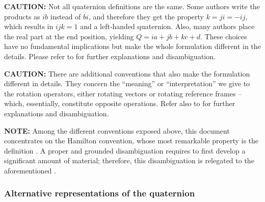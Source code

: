 \bigskip

{\bf CAUTION:} Not all quaternion definitions are the same. 
Some authors write the products as $ib$ instead of $bi$, and therefore they get the property $k = ji = -ij$, which results in $ijk=1$ and a left-handed quaternion. 
Also, many authors place the real part at the end position, yielding $Q = ia + jb + kc + d$. 
These choices have no fundamental implications but make the whole formulation different in the details. 
Please refer to  for further explanations and disambiguation.

\bigskip

{\bf CAUTION:} There are additional conventions that also make the formulation different in details. 
They concern the ``meaning'' or ``interpretation'' we give to the rotation operators, either rotating vectors or rotating reference frames --which, essentially, constitute opposite operations. 
Refer also to  for further explanations and disambiguation.

\bigskip 

{\bf NOTE:} Among the different conventions exposed above, this document concentrates on the Hamilton convention, whose most remarkable property is the definition . A proper and grounded disambiguation requires to first develop a significant amount of material; therefore, this disambiguation is relegated to the aforementioned .



\subsubsection{Alternative representations of the quaternion}
\label{sec:altQuat}

